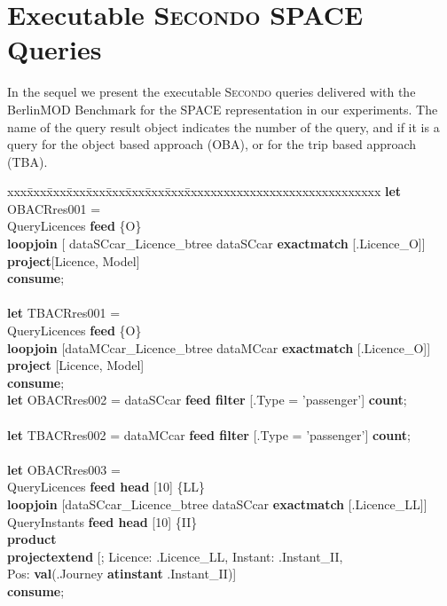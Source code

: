 \documentclass[a4paper]{article}
\newcommand{\secondo}{\textsc{Secondo}}
\newcommand{\bmodb} {BerlinMOD Benchmark}
\newcommand{\op}[1]{\textbf{#1}}
\begin{document}
\section{Executable \secondo{} SPACE Queries}
In the sequel we present the executable \secondo{} queries delivered with the
\bmodb{} for the SPACE representation in our experiments.
The name of the query result object indicates the number of
the query, and if it is a query for the object based approach (OBA), or for the
trip based approach (TBA).
\begin{scriptsize}
\begin{tabbing}
xxx\=xxx\=xxx\=xxx\=xxx\=xxx\=xxx\=xxx\=xxx\=xxxxxxxxxxxxxxxxxxxxxxxxxxxxxx\kill
\op{let} OBACRres001 = \\
\>QueryLicences \op{feed} \{O\}\\
\>\op{loopjoin} [ dataSCcar\_Licence\_btree dataSCcar \op{exactmatch} [.Licence\_O]]\\
\>\op{project}[Licence, Model]\\
\op{consume};\\
\\
\op{let} TBACRres001 = \\
\>QueryLicences \op{feed} \{O\}\\
\>\op{loopjoin} [dataMCcar\_Licence\_btree dataMCcar \op{exactmatch} [.Licence\_O]]\\
\>\op{project} [Licence, Model]\\
\op{consume};
\\
\op{let} OBACRres002 = dataSCcar \op{feed filter} [.Type = 'passenger'] \op{count};\\
\\
\op{let} TBACRres002 = dataMCcar \op{feed filter} [.Type = 'passenger'] \op{count};\\
\\
\op{let} OBACRres003 =\\
\>QueryLicences \op{feed head} [10] \{LL\}\\
\>\>\op{loopjoin} [dataSCcar\_Licence\_btree dataSCcar \op{exactmatch} [.Licence\_LL]]\\
\>QueryInstants \op{feed head} [10] \{II\}\\
\>\op{product}\\
\>\op{projectextend} [; Licence: .Licence\_LL, Instant: .Instant\_II,\\
\>\>\>\> Pos: \op{val}(.Journey \op{atinstant} .Instant\_II)]\\
\op{consume};\\
\\

\end{tabbing}
\end{scriptsize}
\end{document}
